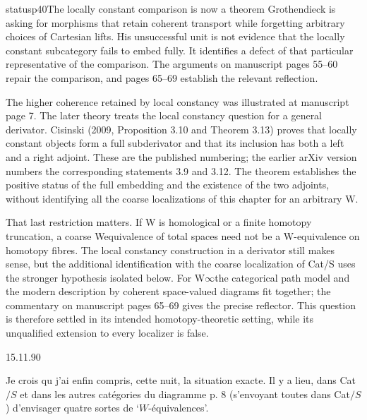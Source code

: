 \begin{dcomment}{status}{p40}{The locally constant comparison is now a theorem}
Grothendieck is asking for morphisms that retain coherent transport while forgetting arbitrary choices of Cartesian lifts. His unsuccessful unit is not evidence that the locally constant subcategory fails to embed fully. It identifies a defect of that particular representative of the comparison. The arguments on manuscript pages 55--60 repair the comparison, and pages 65--69 establish the relevant reflection.

The higher coherence retained by local constancy was illustrated at manuscript page 7. The later theory treats the local constancy question for a general derivator. Cisinski (2009, Proposition 3.10 and Theorem 3.13) proves that locally constant objects form a full subderivator and that its inclusion has both a left and a right adjoint. These are the published numbering; the earlier arXiv version numbers the corresponding statements 3.9 and 3.12. The theorem establishes the positive status of the full embedding and the existence of the two adjoints, without identifying all the coarse localizations of this chapter for an arbitrary W.

That last restriction matters. If W is homological or a finite homotopy truncation, a coarse Wequivalence of total spaces need not be a W-equivalence on homotopy fibres. The local constancy construction in a derivator still makes sense, but the additional identification with the coarse localization of Cat/S uses the stronger hypothesis isolated below. For W\ensuremath{\infty}the categorical path model and the modern description by coherent space-valued diagrams fit together; the commentary on manuscript pages 65--69 gives the precise reflector. This question is therefore settled in its intended homotopy-theoretic setting, while its unqualified extension to every localizer is false.

\end{dcomment}


\begin{flushright}
15.11.90
\end{flushright}

Je crois qu j'ai enfin compris, cette nuit, la situation exacte. Il y a lieu, dans Cat$/S$ et dans les autres catégories du diagramme p. 8 (s'envoyant toutes dans Cat$/S$) d'envisager quatre sortes de ‘$W$-équivalences’. %

